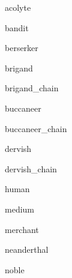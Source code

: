 \documentclass[letterpaper,serif]{module}
\begin{document}
\begin{newmonster}{acolyte}\end{newmonster}

\begin{newmonster}{bandit}\end{newmonster}

\begin{newmonster}{berserker}\end{newmonster}

\begin{newmonster}{brigand}\end{newmonster}

\begin{newmonster}{brigand_chain}\end{newmonster}

\begin{newmonster}{buccaneer}\end{newmonster}

\begin{newmonster}{buccaneer_chain}\end{newmonster}

\begin{newmonster}{dervish}\end{newmonster}

\begin{newmonster}{dervish_chain}\end{newmonster}

\begin{newmonster}{human}\end{newmonster}

\begin{newmonster}{medium}\end{newmonster}

\begin{newmonster}{merchant}\end{newmonster}

\begin{newmonster}{neanderthal}\end{newmonster}

\begin{newmonster}{noble}\end{newmonster}
\end{document}
